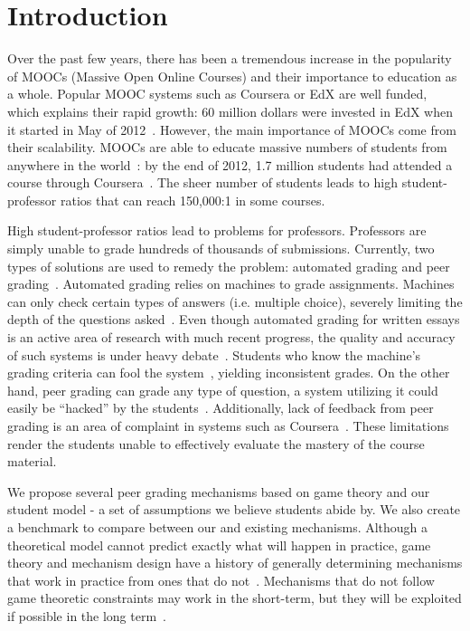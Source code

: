 \documentclass{sigchi}
\begin{document}
\section{Introduction}
Over the past few years, there has been a tremendous increase in the popularity of MOOCs (Massive Open Online Courses) and their importance to education as a whole. Popular MOOC systems such as Coursera or EdX are well funded, which explains their rapid growth: 60 million dollars were invested in EdX when it started in May of 2012~\cite{canMOOCsreducecc}. However, the main importance of MOOCs come from their scalability. MOOCs are able to educate massive numbers of students from anywhere in the world~\cite{makingsenseofMOOCs}: by the end of 2012, 1.7 million students had attended a course through Coursera~\cite{swotanalysisofMOOCs}. The sheer number of students leads to high student-professor ratios that can reach 150,000:1 in some courses.

High student-professor ratios lead to problems for professors. Professors are simply unable to grade hundreds of thousands of submissions. Currently, two types of solutions are used to remedy the problem: automated grading and peer grading~\cite{edxsoftware}. Automated grading relies on machines to grade assignments. Machines can only check certain types of answers (i.e. multiple choice), severely limiting the depth of the questions asked~\cite{rightandwrongMOOCs}. Even though automated grading for written essays is an active area of research with much recent progress, the quality and accuracy of such systems is under heavy debate~\cite{automatedsystemssuck}. Students who know the machine's grading criteria can fool the system~\cite{robogradingproblems}, yielding inconsistent grades.  On the other hand, peer grading can grade any type of question, a system utilizing it could easily be ``hacked'' by the students~\cite{makingsenseofMOOCs}. Additionally, lack of feedback from peer grading is an area of complaint in systems such as Coursera~\cite{howaccurateispeergrading}. These limitations render the students unable to effectively evaluate the mastery of the course material. 

We propose several peer grading mechanisms based on game theory and our student model - a set of assumptions we believe students abide by. We also create a benchmark to compare between our and existing mechanisms. Although a theoretical model cannot predict exactly what will happen in practice, game theory and mechanism design have a history of generally determining mechanisms that work in practice from ones that do not~\cite{AGTbook}. Mechanisms that do not follow game theoretic constraints may work in the short-term, but they will be exploited if possible in the long term~\cite{boycottfinal}.
\end{document}
